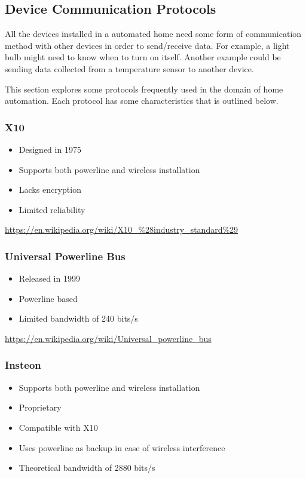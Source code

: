 \subsection{Device Communication Protocols}

All the devices installed in a automated home need some form of communication
method with other devices in order to send/receive data. For example, a light
bulb might need to know when to turn on itself. Another example could be
sending data collected from a temperature sensor to another device.

This section explores some protocols frequently used in the domain of home
automation. Each protocol has some characteristics that is outlined below.

\subsubsection{X10}

\begin{itemize}
\item Designed in 1975
\item Supports both powerline and wireless installation
\item Lacks encryption
\item Limited reliability
\end{itemize}

\url{https://en.wikipedia.org/wiki/X10_%28industry_standard%29}

\subsubsection{Universal Powerline Bus}

\begin{itemize}
\item Released in 1999
\item Powerline based
\item Limited bandwidth of 240 bits/s
\end{itemize}

\url{https://en.wikipedia.org/wiki/Universal_powerline_bus}

\subsubsection{Insteon}

\begin{itemize}
\item Supports both powerline and wireless installation
\item Proprietary
\item Compatible with X10
\item Uses powerline as backup in case of wireless interference
\item Theoretical bandwidth of 2880 bits/s
\end{itemize}

